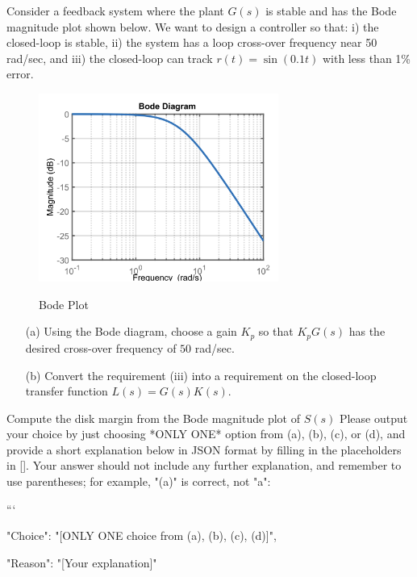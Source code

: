 \documentclass[12pt]{article}
\begin{document}
Consider a feedback system where the plant $G(s)$ is stable and has the Bode magnitude plot shown below. We want to design a controller so that: i) the closed-loop is stable, ii) the system has a loop cross-over frequency near 50 rad/sec, and iii) the closed-loop can track $r(t) = \sin(0.1t)$ with less than 1\% error.
\begin{figure}[h]
    \centering
    \includegraphics[width=0.7\textwidth]{figs/6.8.png}
    \label{fig:bode_94}
    \caption{Bode Plot}
\end{figure}

\begin{itemize}
    \item[(a)] Using the Bode diagram, choose a gain $K_p$ so that $K_p G(s)$ has the desired cross-over frequency of $50$ rad/sec.
    \item[(b)] Convert the requirement (iii) into a requirement on the closed-loop transfer function $L(s) = G(s) K(s)$.
\end{itemize}

Compute the disk margin from the Bode magnitude plot of $S(s)$ 
Please output your choice by just choosing *ONLY ONE* option from (a), (b), (c), or (d), and provide a short explanation below in JSON format by filling in the placeholders in []. Your answer should not include any further explanation, and remember to use parentheses; for example, "(a)" is correct, not "a":

```
{

"Choice": "[ONLY ONE choice from (a), (b), (c), (d)]",

"Reason": "[Your explanation]"

}
\end{document}
